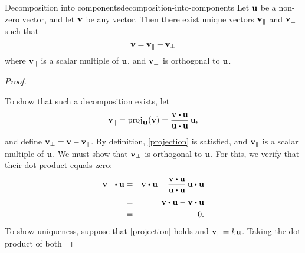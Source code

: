 \begin{theorem}{Decomposition into components}{decomposition-into-components}
  Let $\mbox{\bf u}$ be a non-zero vector, and let $\mbox{\bf v}$ be any
  vector. Then there exist unique vectors $\mbox{\bf v}_{\|}$ and
  $\mbox{\bf v}_{\bot}$ such that
  \begin{equation}\label{projection}
    \mbox{\bf v}=\mbox{\bf v}_{\|}+\mbox{\bf v}_{\bot }
  \end{equation}
  where $\mbox{\bf v}_{\|}$ is a scalar multiple of $\mbox{\bf u}$,
  and $\mbox{\bf v}_{\bot}$ is orthogonal to $\mbox{\bf u}$.
\end{theorem}

\begin{proof}
  \begin{center}
  \end{center}
  To show that such a decomposition exists, let
  \begin{equation*}
    \vect{v}_{\coll} = \proj_{\vect{u}}(\vect{v}) = \frac{\vect{v}\dotprod \vect{u}}{\vect{u}\dotprod \vect{u}}\, \vect{u},
  \end{equation*}
  and define $\mbox{\bf v}_{\bot} = \mbox{\bf v}-\mbox{\bf v}_{\|}$. By
  definition, {\eqref{projection}} is satisfied, and
  $\mbox{\bf v}_{\|}$ is a scalar multiple of $\mbox{\bf u}$. We must show
  that $\mbox{\bf v}_{\bot}$ is orthogonal to $\mbox{\bf u}$. For this,
  we verify that their dot product equals zero:
  \begin{eqnarray*}
    \vect{v}_{\bot }\dotprod \vect{u}
    &=& \vect{v}\dotprod \vect{u}-\frac{\vect{v}\dotprod \vect{u}}{\vect{u}\dotprod\vect{u}}\,\vect{u}\dotprod \vect{u} \\
    &=& \vect{v}\dotprod\vect{u}-\vect{v}\dotprod \vect{u}\\
    &=& 0.
  \end{eqnarray*}
  To show uniqueness, suppose that {\eqref{projection}} holds and
  $\mbox{\bf v}_{\|}= k \mbox{\bf u}$.  Taking the dot product of both

\end{proof}
